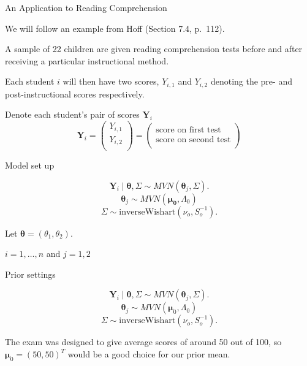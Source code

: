 \documentclass[ignorenonframetext,]{beamer}
\newcommand{\btheta}{{\bm\theta}}
\begin{document}
\begin{frame}{An Application to Reading Comprehension}

We will follow an example from Hoff (Section 7.4, p.~112).

A sample of 22 children are given reading comprehension tests before and
after receiving a particular instructional method.

Each student \(i\) will then have two scores, \(Y_{i,1}\) and
\(Y_{i,2}\) denoting the pre- and post-instructional scores
respectively.

Denote each student's pair of scores \(\bm{Y}_i\) \[
\bm{Y}_{i} = \left( \begin{array}{c}
Y_{i,1}\\
Y_{i,2}\\
\end{array} \right) 
= \left( \begin{array}{c}
\text{score on first test}\\
\text{score on second test}\\
\end{array} \right)
\]

\end{frame}

\begin{frame}{Model set up}

\[\bm{Y}_i \mid \btheta, \Sigma \sim MVN(\btheta_j, \Sigma).\]
\[ \btheta_j \sim MVN(\bm{\mu_0}, \Lambda_0)\]
\[ \Sigma \sim \text{inverseWishart}(\nu_o, S_o^{-1}).\]

Let \(\btheta = (\theta_1, \theta_2).\)

\(i=1,\ldots,n\) and \(j=1,2\)

\end{frame}

\begin{frame}{Prior settings}

\[\bm{Y}_i \mid \btheta, \Sigma \sim MVN(\btheta_j, \Sigma).\]
\[ \btheta_j \sim MVN(\bm{\mu}_0, \Lambda_0)\]
\[ \Sigma \sim \text{inverseWishart}(\nu_o, S_o^{-1}).\]

The exam was designed to give average scores of around 50 out of 100, so
\(\bm{\mu}_0 = (50,50)^T\) would be a good choice for our prior mean.

\end{frame}
\end{document}
